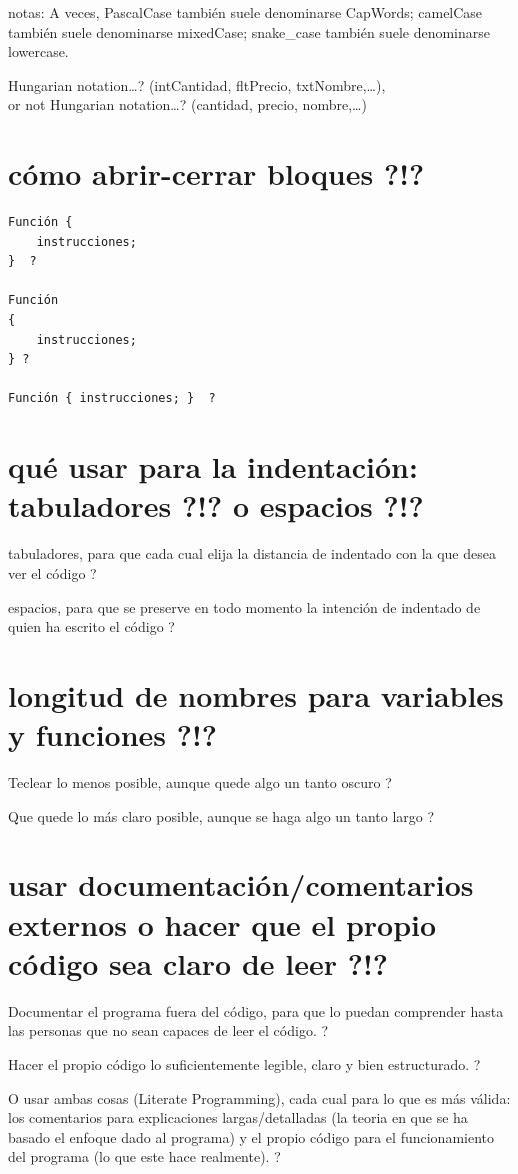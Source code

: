 \documentclass[spanish,12pt,a4paper,final,oneside]{book}
\begin{document}
notas: A veces, PascalCase también suele denominarse CapWords; camelCase también suele denominarse mixedCase; snake\_case también suele denominarse lowercase.

\vspace{0.5cm}
Hungarian notation\ldots? (intCantidad, fltPrecio, txtNombre,\ldots),
\\or not Hungarian notation\ldots? (cantidad, precio, nombre,\ldots)

\section{cómo abrir-cerrar bloques ?!?}
\begin{lstlisting}[frame=single]
Función {
    instrucciones;
}  ?

Función
{
    instrucciones;
} ?

Función { instrucciones; }  ?
\end{lstlisting}

\section{qué usar para la indentación: tabuladores ?!? o espacios ?!? }
tabuladores, para que cada cual elija la distancia de indentado con la que desea ver el código ?

espacios, para que se preserve en todo momento la intención de indentado de quien ha escrito el código ? 

\section{longitud de nombres para variables y funciones ?!?}
Teclear lo menos posible, aunque quede algo un tanto oscuro ?

Que quede lo más claro posible, aunque se haga algo un tanto largo ?

\section{usar documentación/comentarios externos o hacer que el propio código sea claro de leer ?!?}
Documentar el programa fuera del código, para que lo puedan comprender hasta las personas que no sean capaces de leer el código. ?

Hacer el propio código lo suficientemente legible, claro y bien estructurado. ?

O usar ambas cosas (Literate Programming), cada cual para lo que es más válida: los comentarios para explicaciones largas/detalladas (la teoria en que se ha basado el enfoque dado al programa) y el propio código para el funcionamiento del programa (lo que este hace realmente). ?
\end{document}
